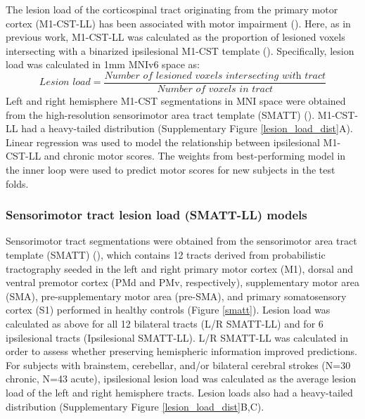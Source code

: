 \documentclass[10pt]{article}
\begin{document}
The lesion load of the corticospinal tract originating from the primary motor cortex (M1-CST-LL) has been associated with motor impairment (\cite{Stinear2017-eg}). Here, as in previous work, M1-CST-LL was calculated as the proportion of lesioned voxels intersecting with a binarized ipsilesional M1-CST template (\cite{Zhu2010-qh}). Specifically, lesion load was calculated in 1mm MNIv6 space as:
\begin{equation}
    \textit{Lesion load} = \frac{\textit{Number of lesioned voxels intersecting with  tract}}{\textit{Number of voxels in tract}}
\end{equation}
Left and right hemisphere M1-CST segmentations in MNI space were obtained from the high-resolution sensorimotor area tract template (SMATT) (\cite{Archer2018-ti}). M1-CST-LL had a heavy-tailed distribution (Supplementary Figure \ref{lesion_load_dist}A).
Linear regression was used to model the relationship between ipsilesional M1-CST-LL and chronic motor scores. The weights from best-performing model in the inner loop were used to predict motor scores for new subjects in the test folds. 

\subsubsection*{Sensorimotor tract lesion load (SMATT-LL) models}
Sensorimotor tract segmentations were obtained from the sensorimotor area tract template (SMATT) (\cite{Archer2018-ti}), which contains 12 tracts derived from probabilistic tractography seeded in the left and right primary motor cortex (M1), dorsal and ventral premotor cortex (PMd and PMv, respectively), supplementary motor area (SMA), pre-supplementary motor area (pre-SMA), and primary somatosensory cortex (S1) performed in healthy controls (Figure \ref{smatt}). Lesion load was calculated as above for all 12 bilateral tracts (L/R SMATT-LL) and for 6 ipsilesional tracts (Ipsilesional SMATT-LL). L/R SMATT-LL was calculated in order to assess whether preserving hemispheric information improved predictions. For subjects with brainstem, cerebellar, and/or bilateral cerebral strokes (N=30 chronic, N=43 acute), ipsilesional lesion load was calculated as the average lesion load of the left and right hemisphere tracts. Lesion loads also had a heavy-tailed distribution (Supplementary Figure \ref{lesion_load_dist}B,C). 
\end{document}
